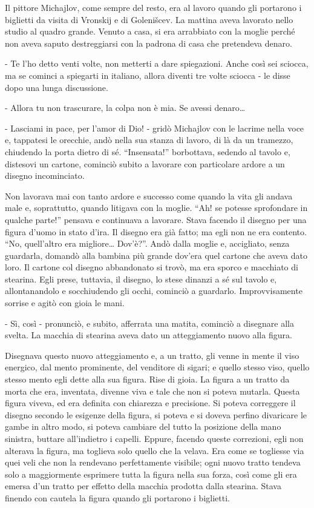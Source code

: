 Il pittore Michajlov, come sempre del resto, era al lavoro quando gli portarono i biglietti da visita di Vronskij e di Golenišcev. La mattina aveva lavorato nello studio al quadro grande. Venuto a casa, si era arrabbiato con la moglie perché non aveva saputo destreggiarsi con la padrona di casa che pretendeva denaro. 

- Te l'ho detto venti volte, non metterti a dare spiegazioni. Anche così sei sciocca, ma se cominci a spiegarti in italiano, allora diventi tre volte sciocca - le disse dopo una lunga discussione. 

- Allora tu non trascurare, la colpa non è mia. Se avessi denaro\ldots{} 

- Lasciami in pace, per l'amor di Dio! - gridò Michajlov con le lacrime nella voce e, tappatesi le orecchie, andò nella sua stanza di lavoro, di là da un tramezzo, chiudendo la porta dietro di sé. ``Insensata!'' borbottava, sedendo al tavolo e, distesovi un cartone, cominciò subito a lavorare con particolare ardore a un disegno incominciato. 

Non lavorava mai con tanto ardore e successo come quando la vita gli andava male e, soprattutto, quando litigava con la moglie. ``Ah! se potesse sprofondare in qualche parte!'' pensava e continuava a lavorare. Stava facendo il disegno per una figura d'uomo in stato d'ira. Il disegno era già fatto; ma egli non ne era contento. ``No, quell'altro era migliore\ldots{} Dov'è?''. Andò dalla moglie e, accigliato, senza guardarla, domandò alla bambina più grande dov'era quel cartone che aveva dato loro. Il cartone col disegno abbandonato si trovò, ma era sporco e macchiato di stearina. Egli prese, tuttavia, il disegno, lo stese dinanzi a sé sul tavolo e, allontanandolo e socchiudendo gli occhi, cominciò a guardarlo. Improvvisamente sorrise e agitò con gioia le mani. 

- Sì, così - pronunciò, e subito, afferrata una matita, cominciò a disegnare alla svelta. La macchia di stearina aveva dato un atteggiamento nuovo alla figura. 

Disegnava questo nuovo atteggiamento e, a un tratto, gli venne in mente il viso energico, dal mento prominente, del venditore di sigari; e quello stesso viso, quello stesso mento egli dette alla sua figura. Rise di gioia. La figura a un tratto da morta che era, inventata, divenne viva e tale che non si poteva mutarla. Questa figura viveva, ed era definita con chiarezza e precisione. Si poteva correggere il disegno secondo le esigenze della figura, si poteva e si doveva perfino divaricare le gambe in altro modo, si poteva cambiare del tutto la posizione della mano sinistra, buttare all'indietro i capelli. Eppure, facendo queste correzioni, egli non alterava la figura, ma toglieva solo quello che la velava. Era come se togliesse via quei veli che non la rendevano perfettamente visibile; ogni nuovo tratto tendeva solo a maggiormente esprimere tutta la figura nella sua forza, così come gli era emersa d'un tratto per effetto della macchia prodotta dalla stearina. Stava finendo con cautela la figura quando gli portarono i biglietti. 

